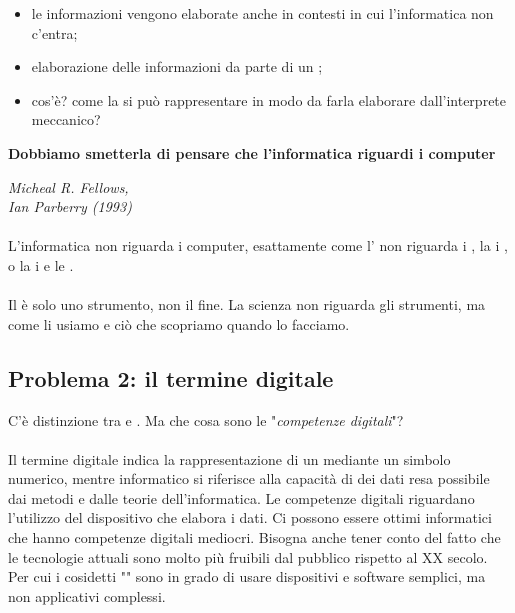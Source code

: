 \begin{itemize}
    \item {} le informazioni vengono elaborate anche in contesti in cui l'informatica non c'entra;
    \item {} elaborazione delle informazioni da parte di un ;
    \item {} cos'è? come la si può rappresentare in modo da farla elaborare dall'interprete meccanico?
\end{itemize}

\epigraph{\textbf{Dobbiamo smetterla di pensare che l'informatica riguardi i computer}}{\textit{Micheal R. Fellows,\\ Ian Parberry (1993)}}
\paragraph{}
L'informatica non riguarda i computer, esattamente come l' non riguarda i , la  i , o la  i  e le .
\paragraph{}
Il  è solo uno strumento, non il fine. La scienza non riguarda gli strumenti, ma come li usiamo e ciò che scopriamo quando lo facciamo.

\subsection{Problema 2: il termine digitale}

C'è distinzione tra  e . Ma che cosa sono le "\textit{competenze digitali}"?


\paragraph{}
 Il termine digitale indica la rappresentazione di un  mediante un simbolo numerico, mentre informatico si riferisce alla capacità di  dei dati resa possibile dai metodi e dalle teorie dell'informatica. Le competenze digitali riguardano l'utilizzo del dispositivo che elabora i dati. Ci possono essere ottimi informatici che hanno competenze digitali mediocri. Bisogna anche tener conto del fatto che le tecnologie attuali sono molto più fruibili dal pubblico rispetto al XX secolo. Per cui i cosidetti "" sono in grado di usare dispositivi e software semplici, ma non applicativi complessi.  


